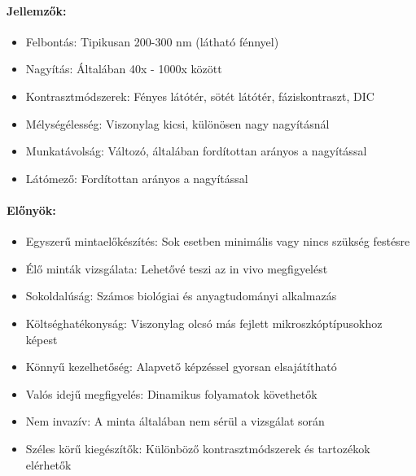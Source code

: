 \documentclass[a4paper,12pt]{article}
\begin{document}
\paragraph{Jellemzők:} \begin{itemize} \item Felbontás: Tipikusan 200-300 nm (látható fénnyel) \item Nagyítás: Általában 40x - 1000x között \item Kontrasztmódszerek: Fényes látótér, sötét látótér, fáziskontraszt, DIC \item Mélységélesség: Viszonylag kicsi, különösen nagy nagyításnál \item Munkatávolság: Változó, általában fordítottan arányos a nagyítással \item Látómező: Fordítottan arányos a nagyítással \end{itemize}

\paragraph{Előnyök:} \begin{itemize} \item Egyszerű mintaelőkészítés: Sok esetben minimális vagy nincs szükség festésre \item Élő minták vizsgálata: Lehetővé teszi az in vivo megfigyelést \item Sokoldalúság: Számos biológiai és anyagtudományi alkalmazás \item Költséghatékonyság: Viszonylag olcsó más fejlett mikroszkóptípusokhoz képest \item Könnyű kezelhetőség: Alapvető képzéssel gyorsan elsajátítható \item Valós idejű megfigyelés: Dinamikus folyamatok követhetők \item Nem invazív: A minta általában nem sérül a vizsgálat során \item Széles körű kiegészítők: Különböző kontrasztmódszerek és tartozékok elérhetők \end{itemize}
\end{document}

